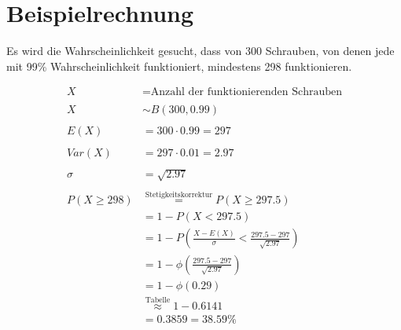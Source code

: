 \section{Beispielrechnung}
Es wird die Wahrscheinlichkeit gesucht, dass von 300 Schrauben, von denen jede mit 99\% Wahrscheinlichkeit funktioniert, mindestens 298 funktionieren.

\begin{align*}
    X &= \text{Anzahl der funktionierenden Schrauben} \\\\
    X &\sim B(300, 0.99) \\\\
    E(X) &= 300 \cdot 0.99 = 297 \\\\
    Var(X) &= 297 \cdot 0.01 = 2.97 \\\\
    \sigma &= \sqrt{2.97} \\\\
    P(X \ge 298) &\overset{\text{Stetigkeitskorrektur}}{=} P(X \ge 297.5) \\
    &= 1 - P(X < 297.5) \\
    &= 1 - P\left(\frac{X - E(X)}{\sigma} < \frac{297.5 - 297}{\sqrt{2.97}}\right) \\
    &= 1 - \phi\left(\frac{297.5 - 297}{\sqrt{2.97}}\right) \\
    &= 1 - \phi(0.29) \\
    &\overset{\text{Tabelle}}{\approx} 1 - 0.6141 \\
    &= 0.3859 = 38.59\% 
\end{align*}